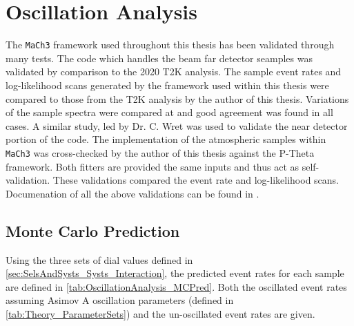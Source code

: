 \chapter{Oscillation Analysis}
\label{chap:OscillationAnalysis}

The \texttt{MaCh3} framework used throughout this thesis has been validated through many tests. The code which handles the beam far detector seamples was validated by comparison to the 2020 T2K analysis. The sample event rates and log-likelihood scans generated by the framework used within this thesis were compared to those from the T2K analysis by the author of this thesis. Variations of the sample spectra were compared at  and good agreement was found in all cases. A similar study, led by Dr. C. Wret was used to validate the near detector portion of the code. The implementation of the atmospheric samples within \texttt{MaCh3} was cross-checked by the author of this thesis against the P-Theta framework. Both fitters are provided the same inputs and thus act as self-validation. These validations compared the event rate and log-likelihood scans. Documenation of all the above validations can be found in \cite{t2k_tn_426}.

\section{Monte Carlo Prediction}
\label{sec:OscillationAnalysis_MonteCarloPred}

Using the three sets of dial values defined in \autoref{sec:SelsAndSysts_Systs_Interaction}, the predicted event rates for each sample are defined in \autoref{tab:OscillationAnalysis_MCPred}. Both the oscillated event rates assuming Asimov A oscillation parameters (defined in \autoref{tab:Theory_ParameterSets}) and the un-oscillated event rates are given.

